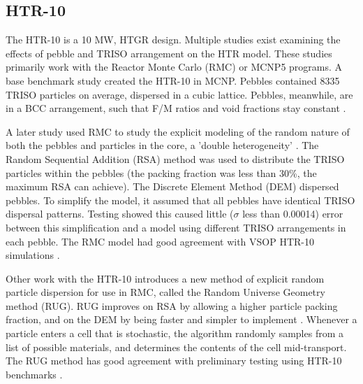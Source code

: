 \subsection{HTR-10}

The HTR-10 is a 10 MW, HTGR design.  Multiple studies exist examining the effects of pebble and TRISO arrangement on the HTR model.  These studies primarily work with the Reactor Monte Carlo (RMC) or MCNP5 programs.  A base benchmark study created the HTR-10 in MCNP.  Pebbles contained 8335 TRISO particles on average, dispersed in a cubic lattice.  Pebbles, meanwhile, are in a BCC arrangement, such that F/M ratios and void fractions stay constant \cite{kim_monte_2005}.

A later study used RMC to study the explicit modeling of the random nature of both the pebbles and particles in the core, a 'double heterogeneity' \cite{ she_explicit_nodate}.  The Random Sequential Addition (RSA) method was used to distribute the TRISO particles within the pebbles (the packing fraction was less than 30\%, the maximum RSA can achieve).  The Discrete Element Method (DEM) dispersed pebbles.  To simplify the model, it assumed that all pebbles have identical TRISO dispersal patterns.  Testing showed this caused little ($\sigma$ less than 0.00014) error between this simplification and a model using different TRISO arrangements in each pebble.  The RMC model had good agreement with VSOP HTR-10 simulations \cite{ she_explicit_nodate}.

Other work with the HTR-10 introduces a new method of explicit random particle dispersion for use in RMC, called the Random Universe Geometry method (RUG).  RUG improves on RSA by allowing a higher particle packing fraction, and on the DEM by being faster and simpler to implement \cite{liu_random_2018}.  Whenever a particle enters a cell that is stochastic, the algorithm randomly samples from a list of possible materials, and determines the contents of the cell mid-transport.  The RUG method has good agreement with preliminary testing using HTR-10 benchmarks \cite{liu_random_2018}.



